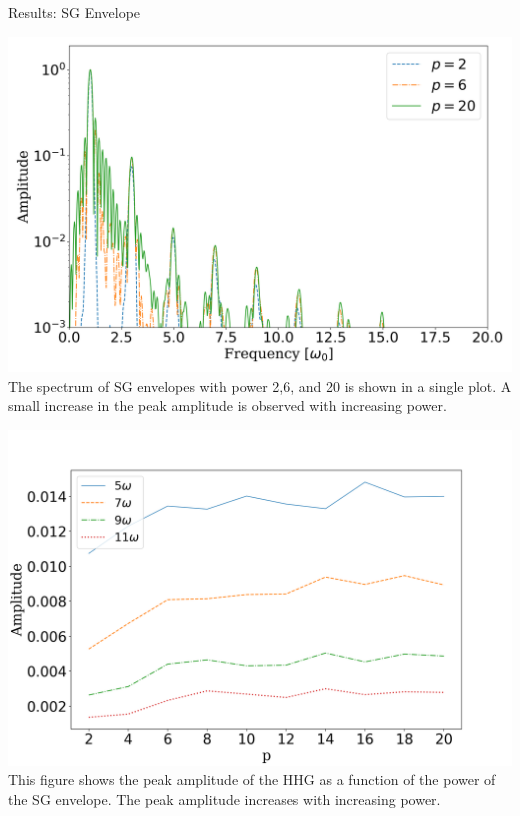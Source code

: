 \documentclass{beamer}
\begin{document}
\begin{frame}{Results: SG Envelope}
    \begin{minipage}[h]{0.48\linewidth}
        \centering
        \includegraphics[width=1\textwidth, height=0.60\textheight]{images/SG_ffts_2-6-20.png}
        \scriptsize{The spectrum of SG envelopes with power 2,6, and 20 is shown in a single plot. A small increase in the peak amplitude is observed with increasing power.}
        \label{fig:sg-fft}
    \end{minipage}
    \begin{minipage}[h]{0.48\linewidth}
        \centering
        \includegraphics[width=1\textwidth, height=0.60\textheight]{images/SG_peak_amplitude.png}
        \scriptsize{This figure shows the peak amplitude of the HHG as a function of the power of the SG envelope. The peak amplitude increases with increasing power.}
        \label{fig:sg-peak}
    \end{minipage}
\end{frame}
\end{document}
